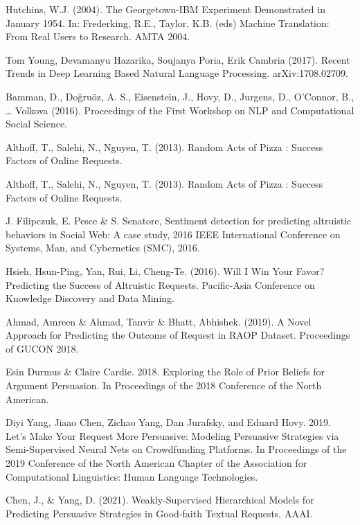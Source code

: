 \documentclass[conference]{IEEEtran}
\begin{document}
\begin{thebibliography}{00}
Hutchins, W.J. (2004). The Georgetown-IBM Experiment Demonstrated in January 1954. In: Frederking, R.E., Taylor, K.B. (eds) Machine Translation: From Real Users to Research. AMTA 2004.

Tom Young, Devamanyu Hazarika, Soujanya Poria, Erik Cambria (2017). Recent Trends in Deep Learning Based Natural Language Processing. arXiv:1708.02709.

Bamman, D., Doğruöz, A. S., Eisenstein, J., Hovy, D., Jurgens, D., O’Connor, B., … Volkova (2016). Proceedings of the First Workshop on NLP and Computational Social Science.

Althoff, T., Salehi, N., Nguyen, T. (2013). Random Acts of Pizza : Success Factors of Online Requests.

Althoff, T., Salehi, N., Nguyen, T. (2013). Random Acts of Pizza : Success Factors of Online Requests.

J. Filipczuk, E. Pesce \& S. Senatore, Sentiment detection for predicting altruistic behaviors in Social Web: A case study, 2016 IEEE International Conference on Systems, Man, and Cybernetics (SMC), 2016.

Hsieh, Hsun-Ping, Yan, Rui, Li, Cheng-Te. (2016). Will I Win Your Favor? Predicting the Success of Altruistic Requests. Pacific-Asia Conference on Knowledge Discovery and Data Mining.

Ahmad, Amreen \& Ahmad, Tanvir & Bhatt, Abhishek. (2019). A Novel Approach for Predicting the Outcome of Request in RAOP Dataset. Proceedings of GUCON 2018.

Esin Durmus \& Claire Cardie. 2018. Exploring the Role of Prior Beliefs for Argument Persuasion. In Proceedings of the 2018 Conference of the North American.

Diyi Yang, Jiaao Chen, Zichao Yang, Dan Jurafsky, and Eduard Hovy. 2019. Let’s Make Your Request More Persuasive: Modeling Persuasive Strategies via Semi-Supervised Neural Nets on Crowdfunding Platforms. In Proceedings of the 2019 Conference of the North American Chapter of the Association for Computational Linguistics: Human Language Technologies.

Chen, J., \& Yang, D. (2021). Weakly-Supervised Hierarchical Models for Predicting Persuasive Strategies in Good-faith Textual Requests. AAAI.


\end{thebibliography}
\end{document}
